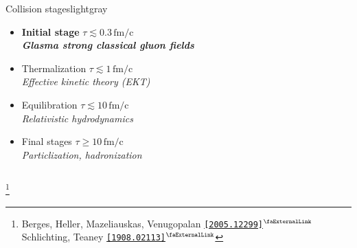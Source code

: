 \documentclass[aspectratio=169,11pt,usenames,dvipsnames]{beamer}
\renewcommand{\thefootnote}{\color{customblue}\faPaperPlaneO}
\newcommand\blfootnote[1]{%
  \begingroup
  \renewcommand\thefootnote{}\footnote{#1}%
  \addtocounter{footnote}{-1}%
  \endgroup
}
\begin{document}
\begin{frame}
\begin{columns}[onlytextwidth,t]
\begin{center}
\begin{custombox2}{\color{normal}Collision stages}{lightgray}
\begin{varwidth}{0.8\textwidth}
\begin{itemize}
                        {\color{lightgray}\scriptsize\itshape Gluon field of high-energy nucleus}
                     \item {{\bfseries\color{palviolet} Initial stage} {\scriptsize $\tau\lesssim
                    0.3\,\mathrm{fm/c}$}}\\[1pt]
                        {\color{lightgray}\scriptsize\itshape {\bfseries\color{palviolet}Glasma strong classical gluon fields}}
                     \item Thermalization {\scriptsize$\tau\lesssim
                    1\,\mathrm{fm/c}$}\\[1pt] 
                        {\color{lightgray}\scriptsize\itshape Effective kinetic theory (EKT)} 
                    \item Equilibration {\scriptsize $\tau\lesssim 10\,\mathrm{fm/c}$}\\[1pt]
                    {\color{lightgray}\scriptsize\itshape Relativistic hydrodynamics} 
                    \item Final stages {\scriptsize $\tau\geq 10\,\mathrm{fm/c}$}\\[1pt]
                    {\color{lightgray}\scriptsize\itshape Particlization, hadronization}
                \end{itemize}
                \end{varwidth}
            \end{custombox2}
            \end{center}
    \end{columns}
    \blfootnote{\scriptsize Berges, Heller, Mazeliauskas, Venugopalan \href{https://arxiv.org/abs/2005.12299}{{\color{palgold}\texttt{[2005.12299]$^\text{\scalebox{0.9}{\faExternalLink}}$}}} Schlichting, Teaney \href{https://arxiv.org/abs/1908.02113}{{\color{palgold}\texttt{[1908.02113]$^\text{\scalebox{0.9}{\faExternalLink}}$}}}}
\end{frame}
\end{document}
